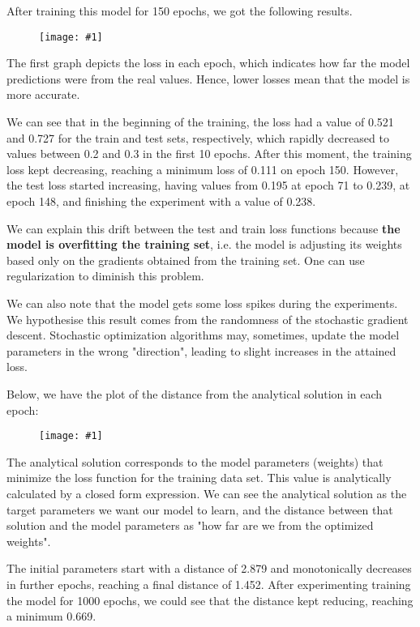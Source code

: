 \documentclass[10pt]{article}
\newcommand{\img}[1]{\begin{figure}[H]\centering\texttt{[image: \#1]}\end{figure}}
\begin{document}
After training this model for 150 epochs, we got the following results.

\img{results/q2/2_a/linreg_v3/loss.png}

The first graph depicts the loss in each epoch, which indicates how far the model predictions were from the real values.
Hence, lower losses mean that the model is more accurate.

We can see that in the beginning of the training, the loss had a value of 0.521 and 0.727 for the train and test sets, respectively, which rapidly decreased to values between 0.2 and 0.3 in the first 10 epochs.
After this moment, the training loss kept decreasing, reaching a minimum loss of 0.111 on epoch 150.
However, the test loss started increasing, having values from 0.195 at epoch 71 to 0.239, at epoch 148, and finishing the experiment with a value of 0.238.

We can explain this drift between the test and train loss functions because \textbf{the model is overfitting the training set}, i.e. the model is adjusting its weights based only on the gradients obtained from the training set.
One can use regularization to diminish this problem.

We can also note that the model gets some loss spikes during the experiments.
We hypothesise this result comes from the randomness of the stochastic gradient descent.
Stochastic optimization algorithms may, sometimes, update the model parameters in the wrong "direction", leading to slight increases in the attained loss.

Below, we have the plot of the distance from the analytical solution in each epoch:
\img{results/q2/2_a/linreg_v3/dist.png}

The analytical solution corresponds to the model parameters (weights) that minimize the loss function for the training data set.
This value is analytically calculated by a closed form expression.
We can see the analytical solution as the target parameters we want our model to learn, and the distance between that solution and the model parameters as "how far are we from the optimized weights".

The initial parameters start with a distance of 2.879 and monotonically decreases in further epochs, reaching a final distance of 1.452.
After experimenting training the model for 1000 epochs, we could see that the distance kept reducing, reaching a minimum 0.669.
\end{document}
